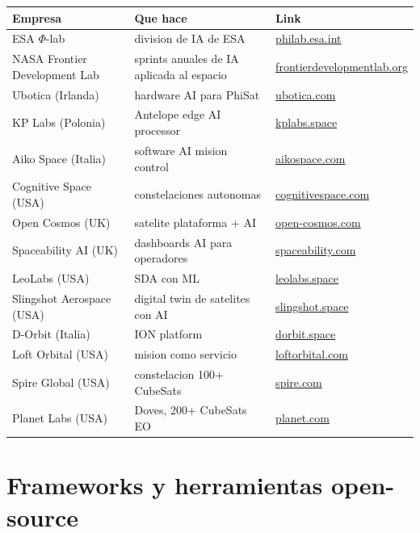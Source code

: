 \documentclass[11pt,a4paper,oneside]{report}
\begin{document}
\begin{longtable}{p{4cm}p{6cm}p{4cm}}
\toprule
\textbf{Empresa} & \textbf{Que hace} & \textbf{Link} \\
\midrule
\endhead
ESA $\Phi$-lab            & division de IA de ESA & \href{https://philab.esa.int}{philab.esa.int} \\
NASA Frontier Development Lab & sprints anuales de IA aplicada al espacio & \href{https://frontierdevelopmentlab.org}{frontierdevelopmentlab.org} \\
Ubotica (Irlanda)         & hardware AI para PhiSat & \href{https://ubotica.com}{ubotica.com} \\
KP Labs (Polonia)         & Antelope edge AI processor & \href{https://kplabs.space}{kplabs.space} \\
Aiko Space (Italia)       & software AI mision control & \href{https://aikospace.com}{aikospace.com} \\
Cognitive Space (USA)     & constelaciones autonomas & \href{https://cognitivespace.com}{cognitivespace.com} \\
Open Cosmos (UK)          & satelite plataforma + AI & \href{https://www.open-cosmos.com}{open-cosmos.com} \\
Spaceability AI (UK)      & dashboards AI para operadores & \href{https://spaceability.com}{spaceability.com} \\
LeoLabs (USA)             & SDA con ML & \href{https://leolabs.space}{leolabs.space} \\
Slingshot Aerospace (USA) & digital twin de satelites con AI & \href{https://slingshot.space}{slingshot.space} \\
D-Orbit (Italia)          & ION platform & \href{https://www.dorbit.space}{dorbit.space} \\
Loft Orbital (USA)        & mision como servicio & \href{https://loftorbital.com}{loftorbital.com} \\
Spire Global (USA)        & constelacion 100+ CubeSats & \href{https://spire.com}{spire.com} \\
Planet Labs (USA)         & Doves, 200+ CubeSats EO & \href{https://www.planet.com}{planet.com} \\
\bottomrule
\end{longtable}

\chapter{Frameworks y herramientas open-source}
\end{document}
